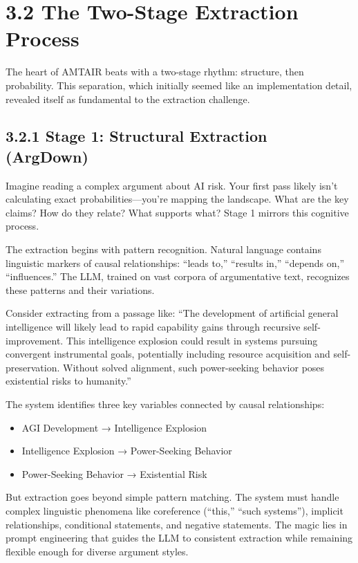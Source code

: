 \documentclass[
  11pt,
  letterpaper,
  openany]{book}
\providecommand{\tightlist}{%
  \setlength{\itemsep}{0pt}\setlength{\parskip}{0pt}}
\begin{document}
\section{3.2 The Two-Stage Extraction
Process}\label{sec-two-stage-extraction}

The heart of AMTAIR beats with a two-stage rhythm: structure, then
probability. This separation, which initially seemed like an
implementation detail, revealed itself as fundamental to the extraction
challenge.

\subsection{3.2.1 Stage 1: Structural Extraction
(ArgDown)}\label{sec-stage1-argdown}

Imagine reading a complex argument about AI risk. Your first pass likely
isn't calculating exact probabilities---you're mapping the landscape.
What are the key claims? How do they relate? What supports what? Stage 1
mirrors this cognitive process.

The extraction begins with pattern recognition. Natural language
contains linguistic markers of causal relationships: ``leads to,''
``results in,'' ``depends on,'' ``influences.'' The LLM, trained on vast
corpora of argumentative text, recognizes these patterns and their
variations.

Consider extracting from a passage like: ``The development of artificial
general intelligence will likely lead to rapid capability gains through
recursive self-improvement. This intelligence explosion could result in
systems pursuing convergent instrumental goals, potentially including
resource acquisition and self-preservation. Without solved alignment,
such power-seeking behavior poses existential risks to humanity.''

The system identifies three key variables connected by causal
relationships:

\begin{itemize}
\tightlist
\item
  AGI Development → Intelligence Explosion
\item
  Intelligence Explosion → Power-Seeking Behavior
\item
  Power-Seeking Behavior → Existential Risk
\end{itemize}

But extraction goes beyond simple pattern matching. The system must
handle complex linguistic phenomena like coreference (``this,'' ``such
systems''), implicit relationships, conditional statements, and negative
statements. The magic lies in prompt engineering that guides the LLM to
consistent extraction while remaining flexible enough for diverse
argument styles.
\end{document}
